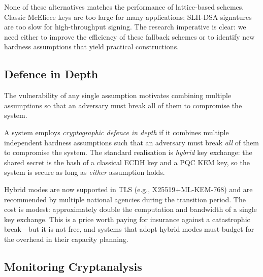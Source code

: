 None of these alternatives matches the performance of lattice-based schemes.  Classic McEliece keys are too large for many applications; SLH-DSA signatures are too slow for high-throughput signing.  The research imperative is clear: we need either to improve the efficiency of these fallback schemes or to identify new hardness assumptions that yield practical constructions.

\subsection{Defence in Depth}
\label{subsec:defence-depth}

The vulnerability of any single assumption motivates combining multiple assumptions so that an adversary must break all of them to compromise the system.

\begin{definition}
\label{def:defence-depth}
A system employs \emph{cryptographic defence in depth} if it combines multiple independent hardness assumptions such that an adversary must break \emph{all} of them to compromise the system.  The standard realisation is \emph{hybrid} key exchange: the shared secret is the hash of a classical ECDH key and a PQC KEM key, so the system is secure as long as \emph{either} assumption holds.
\end{definition}

Hybrid modes are now supported in TLS (e.g., X25519+ML-KEM-768) and are recommended by multiple national agencies during the transition period.  The cost is modest: approximately double the computation and bandwidth of a single key exchange.  This is a price worth paying for insurance against a catastrophic break---but it is not free, and systems that adopt hybrid modes must budget for the overhead in their capacity planning.

\subsection{Monitoring Cryptanalysis}
\label{subsec:monitoring}

